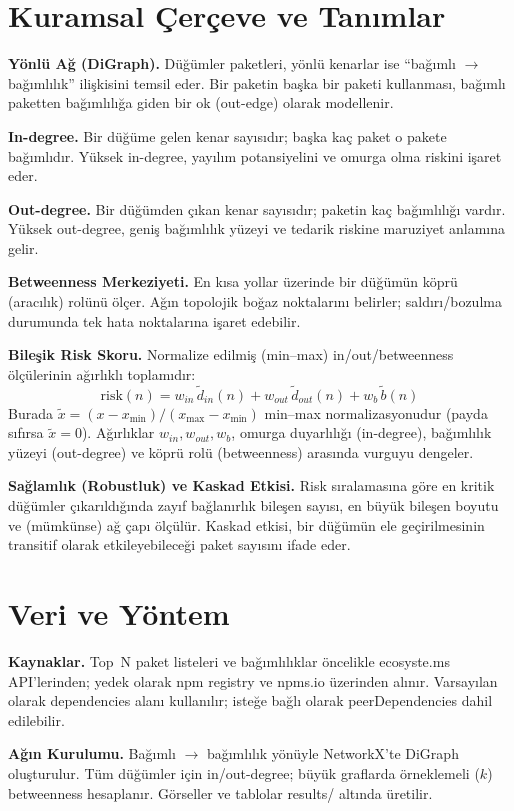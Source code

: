 \documentclass[11pt,a4paper]{article}
\begin{document}
\section{Kuramsal Çerçeve ve Tanımlar}
\textbf{Yönlü Ağ (DiGraph).} Düğümler paketleri, yönlü kenarlar ise ``bağımlı $\to$ bağımlılık'' ilişkisini temsil eder. Bir paketin başka bir paketi kullanması, bağımlı paketten bağımlılığa giden bir ok (out-edge) olarak modellenir.

\textbf{In-degree.} Bir düğüme gelen kenar sayısıdır; başka kaç paket o pakete bağımlıdır. Yüksek in-degree, yayılım potansiyelini ve omurga olma riskini işaret eder.

\textbf{Out-degree.} Bir düğümden çıkan kenar sayısıdır; paketin kaç bağımlılığı vardır. Yüksek out-degree, geniş bağımlılık yüzeyi ve tedarik riskine maruziyet anlamına gelir.

\textbf{Betweenness Merkeziyeti.} En kısa yollar üzerinde bir düğümün köprü (aracılık) rolünü ölçer. Ağın topolojik boğaz noktalarını belirler; saldırı/bozulma durumunda tek hata noktalarına işaret edebilir.

\textbf{Bileşik Risk Skoru.} Normalize edilmiş (min--max) in/out/betweenness ölçülerinin ağırlıklı toplamıdır:
\[\mathrm{risk}(n) = w_{in}\,\tilde d_{in}(n) + w_{out}\,\tilde d_{out}(n) + w_b\,\tilde b(n)\]
Burada $\tilde x = (x - x_{\min})/(x_{\max}-x_{\min})$ min--max normalizasyonudur (payda sıfırsa $\tilde x=0$). Ağırlıklar $w_{in}, w_{out}, w_b$, omurga duyarlılığı (in-degree), bağımlılık yüzeyi (out-degree) ve köprü rolü (betweenness) arasında vurguyu dengeler.

\textbf{Sağlamlık (Robustluk) ve Kaskad Etkisi.} Risk sıralamasına göre en kritik düğümler çıkarıldığında zayıf bağlanırlık bileşen sayısı, en büyük bileşen boyutu ve (mümkünse) ağ çapı ölçülür. Kaskad etkisi, bir düğümün ele geçirilmesinin transitif olarak etkileyebileceği paket sayısını ifade eder.

\section{Veri ve Yöntem}
\textbf{Kaynaklar.} Top~N paket listeleri ve bağımlılıklar öncelikle ecosyste.ms API’lerinden; yedek olarak npm registry ve npms.io üzerinden alınır. Varsayılan olarak dependencies alanı kullanılır; isteğe bağlı olarak peerDependencies dahil edilebilir.

\textbf{Ağın Kurulumu.} Bağımlı $\to$ bağımlılık yönüyle NetworkX’te DiGraph oluşturulur. Tüm düğümler için in/out-degree; büyük graflarda örneklemeli ($k$) betweenness hesaplanır. Görseller ve tablolar results/ altında üretilir.
\end{document}
